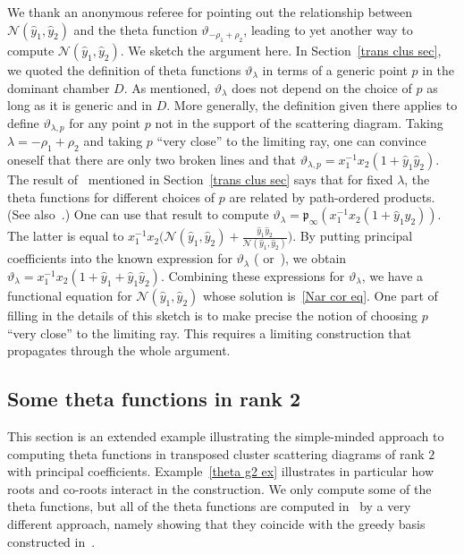 \documentclass[ALCO,ThmDefs,Unicode,epreuves]{cedram}
\newcommand{\thet}{\vartheta}
\newcommand{\N}{{\mathcal N}}
\newcommand{\p}{{\mathfrak p}}
\newcommand{\hy}{\hat{y}}
\begin{document}
\begin{rema}\label{anon}
We thank an anonymous referee for pointing out the relationship between $\N(\hy_1,\hy_2)$ and the theta function $\thet_{-\rho_1+\rho_2}$, leading to yet another way to compute $\N(\hy_1,\hy_2)$.
We sketch the argument here.
In Section~\ref{trans clus sec}, we quoted the definition of theta functions $\thet_\lambda$ in terms of a generic point $p$ in the dominant chamber $D$.
As mentioned, $\thet_\lambda$ does not depend on the choice of $p$ as long as it is generic and in $D$.
More generally, the definition given there applies to define $\thet_{\lambda,p}$ for any point $p$ not in the support of the scattering diagram.
Taking $\lambda=-\rho_1+\rho_2$ and taking $p$ ``very close'' to the limiting ray, one can convince oneself that there are only two broken lines and that $\thet_{\lambda,p}=x_1^{-1}x_2(1+\hy_1\hy_2)$.
The result of~\cite[Section~4]{CPS} mentioned in Section~\ref{trans clus sec} says that for fixed $\lambda$, the theta functions for different choices of $p$ are related by path-ordered products.
(See also~\cite[Theorem~3.5]{GHKK}.)
One can use that result to compute $\thet_\lambda=\p_\infty(x_1^{-1}x_2(1+\hy_1\hy_2))$.
The latter is equal to $x_1^{-1}x_2\bigl(\N(\hy_1,\hy_2)+\frac{\hy_1\hy_2}{\N(\hy_1,\hy_2)}\bigr)$.
By putting principal coefficients into the known expression for $\thet_\lambda$ (\eg \cite[Example~3.10]{GHKK} or~\cite[Example~3.8]{CGMMRSW}), we obtain ${\thet_{\lambda}=x_1^{-1}x_2(1+\hy_1+\hy_1\hy_2)}$.
Combining these expressions for $\thet_\lambda$, we have a functional equation for $\N(\hy_1,\hy_2)$ whose solution is~\eqref{Nar cor eq}.
One part of filling in the details of this sketch is to make precise the notion of choosing $p$ ``very close'' to the limiting ray.
This requires a limiting construction that propagates through the whole argument.
\end{rema}


\subsection{Some theta functions in rank 2}\label{rk2 theta sec}
This section is an extended example illustrating the simple-minded approach to computing theta functions in transposed cluster scattering diagrams of rank $2$ with principal coefficients.
Example~\ref{theta g2 ex} illustrates in particular how roots and co-roots interact in the construction.
We only compute some of the theta functions, but all of the theta functions are computed in~\cite{CGMMRSW} by a very different approach, namely showing that they coincide with the greedy basis constructed in~\cite{greedy}.
\end{document}
